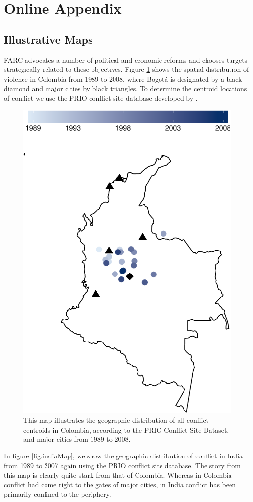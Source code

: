 
\newpage
\section*{Online Appendix}
\label{online_appendix}

\subsection{Illustrative Maps}
\label{maps}

FARC advocates a number of political and economic reforms and chooses targets strategically related to these objectives. Figure \ref{fig:colombiaMap} shows the spatial distribution of violence in Colombia from 1989 to 2008, where Bogot\'{a} is designated by a black diamond and major cities by black triangles. To determine the centroid locations of conflict we use the PRIO conflict site database developed by \citet{hallberg:2012}. 

\begin{figure}[ht]
	\centering
	\includegraphics[width=.5\textwidth]{colombiaMap-crop}
	\caption{This map illustrates the geographic distribution of all conflict centroids in Colombia, according to the PRIO Conflict Site Dataset, and major cities from 1989 to 2008.}
	\label{fig:colombiaMap}
\end{figure}

In figure \ref{fig:indiaMap}, we show the geographic distribution of conflict in India from 1989 to 2007 again using the PRIO conflict site database. The story from this map is clearly quite stark from that of Colombia. Whereas in Colombia conflict had come right to the gates of major cities, in India conflict has been primarily confined to the periphery.

